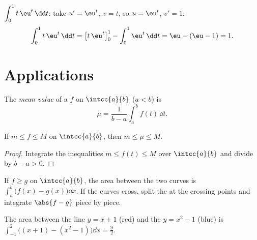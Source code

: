 \begin{example}\label{ex:g12:integ:ibp}
$\displaystyle\int_0^1 t\,\eu^{t}\,\dd t$: take $u' = \eu^t$, $v = t$, so
$u = \eu^t$, $v' = 1$:
\[
\int_0^1 t\,\eu^t\,\dd t = \bigl[t\,\eu^t\bigr]_0^1 - \int_0^1 \eu^t\,\dd t
= \eu - (\eu - 1) = 1 .
\]
\end{example}

\section{Applications}

\begin{definition}\label{def:g12:integ:mean}
The \emph{mean value} of a   $f$ on
$\intcc{a}{b}$ ($a<b$) is
\[
\mu = \frac{1}{b-a}\int_a^b f(t)\,\dd t .
\]
\end{definition}

\begin{proposition}\label{prop:g12:integ:meanbounds}
If $m \leq f \leq M$ on $\intcc{a}{b}$, then $m \leq \mu \leq M$.
\end{proposition}

\begin{proof}
Integrate the inequalities $m \leq f(t) \leq M$ over $\intcc{a}{b}$ and
divide by $b - a > 0$.
\end{proof}

\begin{method}\label{met:g12:integ:areabetween}
If $f \geq g$ on $\intcc{a}{b}$, the area between the two curves is
$\int_a^b \bigl(f(x) - g(x)\bigr)\dd x$. If the curves cross, split the
 at the crossing points and integrate $\abs{f - g}$ piece by piece.
\end{method}

\begin{omfigure}

{\small The area between the line $y = x + 1$ (red) and the 
$y = x^2 - 1$ (blue) is $\int_{-1}^{2}
\bigl((x+1) - (x^2-1)\bigr)\dd x = \frac92$.}
\end{omfigure}


